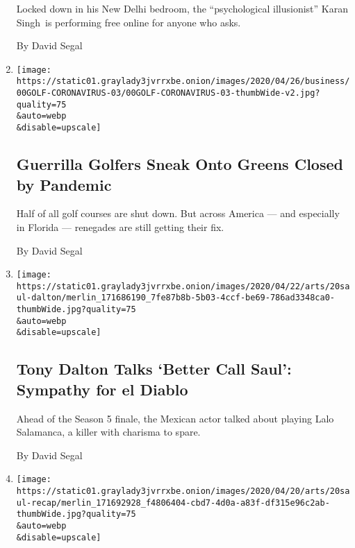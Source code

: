 \begin{enumerate}
  Locked down in his New Delhi bedroom, the ``psychological
  illusionist'' Karan Singh~is performing free online for anyone who
  asks.

  By David Segal
\item
  \href{/2020/04/24/business/coronavirus-golfers.html}{}

  \texttt{[image: https://static01.graylady3jvrrxbe.onion/images/2020/04/26/business/00GOLF-CORONAVIRUS-03/00GOLF-CORONAVIRUS-03-thumbWide-v2.jpg?quality=75\\\&auto=webp\\\&disable=upscale]}

  \hypertarget{guerrilla-golfers-sneak-onto-greens-closed-by-pandemic}{%
  \subsection{Guerrilla Golfers Sneak Onto Greens Closed by
  Pandemic}\label{guerrilla-golfers-sneak-onto-greens-closed-by-pandemic}}

  Half of all golf courses are shut down. But across America --- and
  especially in Florida --- renegades are still getting their fix.

  By David Segal
\item
  \href{/2020/04/20/arts/television/tony-dalton-better-call-saul-finale.html}{}

  \texttt{[image: https://static01.graylady3jvrrxbe.onion/images/2020/04/22/arts/20saul-dalton/merlin\_171686190\_7fe87b8b-5b03-4ccf-be69-786ad3348ca0-thumbWide.jpg?quality=75\\\&auto=webp\\\&disable=upscale]}

  \hypertarget{tony-dalton-talks-better-call-saul-sympathy-for-el-diablo}{%
  \subsection{Tony Dalton Talks `Better Call Saul': Sympathy for el
  Diablo}\label{tony-dalton-talks-better-call-saul-sympathy-for-el-diablo}}

  Ahead of the Season 5 finale, the Mexican actor talked about playing
  Lalo Salamanca, a killer with charisma to spare.

  By David Segal
\item
  \href{/2020/04/20/arts/television/better-call-saul-season-5-finale-recap.html}{}

  \texttt{[image: https://static01.graylady3jvrrxbe.onion/images/2020/04/20/arts/20saul-recap/merlin\_171692928\_f4806404-cbd7-4d0a-a83f-df315e96c2ab-thumbWide.jpg?quality=75\\\&auto=webp\\\&disable=upscale]}

  \hypertarget{better-call-saul}{%
}
\end{enumerate}
